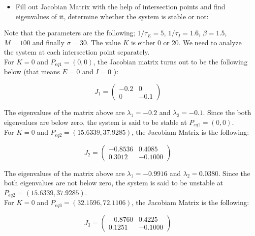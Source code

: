 \documentclass{article}
\begin{document}
\begin{itemize}
 \item Fill out Jacobian Matrix with the help of intersection points and find eigenvalues of it, determine whether the system is stable or not:
\end{itemize}

Note that the parameters are the following; $1/\tau_E=5$, $1/\tau_I=1.6$, $\beta=1.5$, $M=100$ and finally $\sigma=30$. The value $K$ is either 0 or 20.
We need to analyze the system at each intersection point separately.\\

For $K=0$ and $P_{eq1}=(0,0)$, the Jacobian matrix turns out to be the following below (that means $E=0$ and $I=0$ ):

\textbf{}
\begin{large}\[
 J_1=
\left ( \begin{array}{cc}
-0.2 & 0 \\
0 & -0.1
\end{array} \right )
\]\end{large}

The eigenvalues of the matrix above are $\lambda_1=-0.2$ and $\lambda_2=-0.1$. Since the both eigenvalues are below zero, the system is said to be stable at $P_{eq1}=(0,0)$.\\

For $K=0$ and $P_{eq2}=(15.6339, 37.9285)$, the Jacobiam Matrix is the following:

\textbf{}
\begin{large}\[
 J_2=
\left ( \begin{array}{cc}
   -0.8536  &  0.4085 \\
    0.3012  & -0.1000
\end{array} \right )
\]\end{large}

The eigenvalues of the matrix above are $\lambda_1=-0.9916$ and $\lambda_2=0.0380$. Since the both eigenvalues are not below zero, the system is said to be unstable at $P_{eq2}=(15.6339, 37.9285)$.\\

For $K=0$ and $P_{eq3}=(32.1596, 72.1106)$, the Jacobiam Matrix is the following:

  
\textbf{}
\begin{large}\[
 J_3=
\left ( \begin{array}{cc}
    -0.8760  &  0.4225 \\
    0.1251  & -0.1000
\end{array} \right )
\]\end{large}
\end{document}
